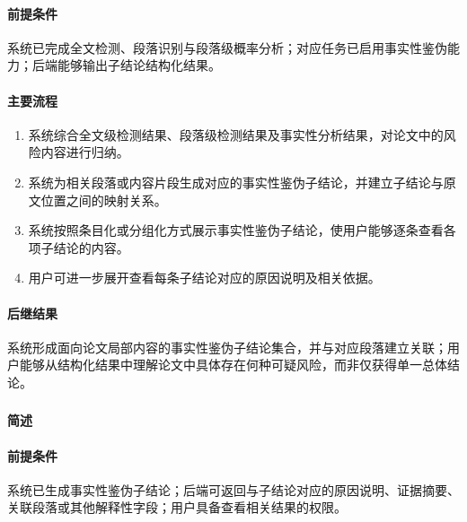 \paragraph*{前提条件}

系统已完成全文检测、段落识别与段落级概率分析；对应任务已启用事实性鉴伪能力；后端能够输出子结论结构化结果。

\paragraph*{主要流程}

\begin{enumerate}
    \item 系统综合全文级检测结果、段落级检测结果及事实性分析结果，对论文中的风险内容进行归纳。
    \item 系统为相关段落或内容片段生成对应的事实性鉴伪子结论，并建立子结论与原文位置之间的映射关系。
    \item 系统按照条目化或分组化方式展示事实性鉴伪子结论，使用户能够逐条查看各项子结论的内容。
    \item 用户可进一步展开查看每条子结论对应的原因说明及相关依据。
\end{enumerate}

\paragraph*{后继结果}

系统形成面向论文局部内容的事实性鉴伪子结论集合，并与对应段落建立关联；用户能够从结构化结果中理解论文中具体存在何种可疑风险，而非仅获得单一总体结论。

\subsubsection{}

\paragraph*{简述}


\paragraph*{前提条件}

系统已生成事实性鉴伪子结论；后端可返回与子结论对应的原因说明、证据摘要、关联段落或其他解释性字段；用户具备查看相关结果的权限。

